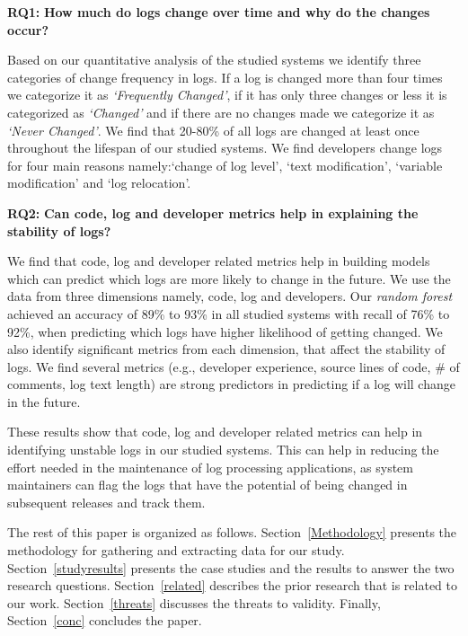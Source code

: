 
\textbf{RQ1:} \textbf{How much do logs change over time and why do the changes occur?}

Based on our quantitative analysis of the studied systems we identify three categories of change frequency in logs. If a log is changed more than four times we categorize it as \textsl{`Frequently Changed'}, if it has only three changes or less  it is categorized as \textsl{`Changed'} and if there are no changes made we categorize it as \textsl{`Never Changed'}. We find that 20-80\% of all logs are changed at least once throughout the lifespan of our studied systems. We find developers change logs for four main reasons namely:`change of log level', `text modification', `variable modification' and `log relocation'.


\textbf{RQ2:} \textbf{Can code, log and developer metrics help in explaining the stability of logs?}

 We find that code, log and developer related metrics help in building models which can predict which logs are more likely to change in the future. We use the data from three dimensions namely, code, log and developers. Our \textsl{random forest} achieved an accuracy of 89\% to 93\% in all studied systems with recall of 76\% to 92\%, when predicting which logs have higher likelihood of getting changed. We also identify significant metrics from each dimension, that affect the stability of logs. We find several metrics (e.g., developer experience, source lines of code, \# of comments, log text length) are strong predictors in predicting if a log will change in the future. 
 
 
 These results show that code, log and developer related metrics can help in identifying unstable logs in our studied systems. This can help in reducing the effort needed in the maintenance of log processing applications, as system maintainers can flag the logs that have the potential of being changed in subsequent releases and track them. 
 
The rest of this paper is organized as follows. Section~\ref{Methodology} presents the methodology for gathering and extracting data for our study. Section~\ref{studyresults} presents the case studies and the results to answer the two research questions. Section~\ref{related} describes the prior research that is related to our work. Section~\ref{threats} discusses the threats to validity. Finally, Section~\ref{conc} concludes the paper.
 
 

